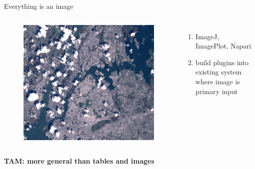 \documentclass[xcolor={dvipsnames}, handout]{beamer}
\begin{document}
\begin{frame}{Everything is an image}
    \begin{columns}
        \begin{figure}
            \includegraphics[width=1\textwidth]{figures/intro/landsat.png}
        \end{figure}
        \begin{enumerate}
            \item ImageJ\cite{schneiderNIHImageImageJ2012}, ImagePlot\cite{studiesCulturevisImageplot2021}, Napari\cite{nicholas_sofroniew_2021_4533308}
            \item build plugins into existing system where image is primary input
        \end{enumerate}
    \end{columns}
    \pause
    \begin{center}
        \textbf{TAM: more general than tables and images}
    \end{center}
\end{frame}
\end{document}

